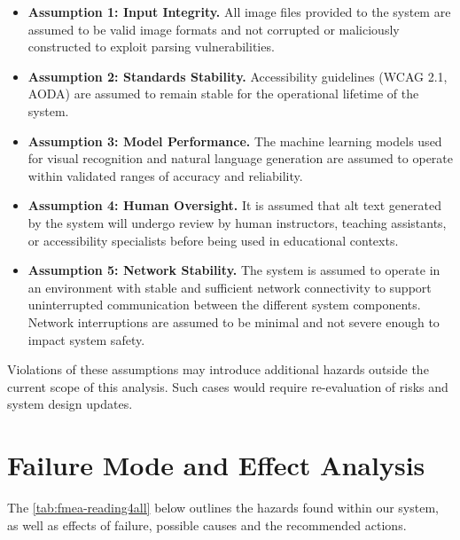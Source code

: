 \documentclass{article}
\begin{document}
\begin{itemize}
  \item \textbf{Assumption 1: Input Integrity.} All image files provided
    to the system are assumed to be valid image formats and not corrupted
    or maliciously constructed to exploit parsing vulnerabilities.

  \item \textbf{Assumption 2: Standards Stability.} Accessibility
    guidelines (WCAG 2.1, AODA) are assumed to remain stable for the
    operational lifetime of the system.

  \item \textbf{Assumption 3: Model Performance.} The machine learning
    models used for visual recognition and natural language generation are
    assumed to operate within validated ranges of accuracy and reliability.

  \item \textbf{Assumption 4: Human Oversight.} It is assumed that
    alt text generated by the system will undergo review by human
    instructors, teaching assistants, or accessibility specialists before
    being used in educational contexts.
  
  \item \textbf{Assumption 5: Network Stability.} The system is assumed to operate in an environment 
  with stable and sufficient network connectivity to support uninterrupted communication 
  between the different system components. Network interruptions are assumed to be 
  minimal and not severe enough to impact system safety.
\end{itemize}

Violations of these assumptions may introduce additional hazards outside
the current scope of this analysis. Such cases would require
re-evaluation of risks and system design updates.

\section{Failure Mode and Effect Analysis}
The \autoref{tab:fmea-reading4all} below outlines the hazards found within our system, as well as effects of failure, possible causes and the recommended actions. 
\end{document}
